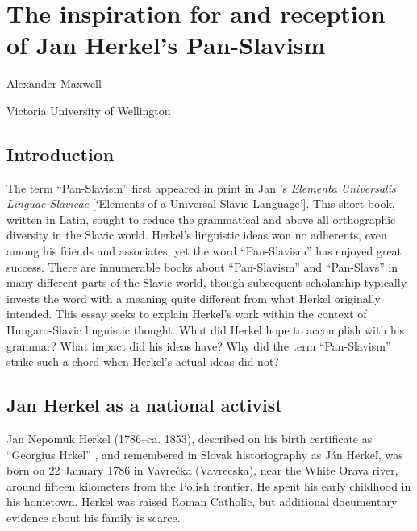 \chapter{The inspiration for and reception of Jan Herkel’s Pan-Slavism}
\label{ch:Maxwell}

{\Large Alexander Maxwell}\smallskip

\noindent Victoria University of Wellington\bigskip

\section{Introduction}

\noindent The term “Pan-Slavism” first appeared in print in Jan \citeauthor{herkel_elementa_1826}’s \citeyear{herkel_elementa_1826} \textit{Elementa Universalis Linguae Slavicae} [‘Elements of a Universal Slavic Language’]. This short book, written in Latin, sought to reduce the grammatical and above all orthographic diversity in the Slavic world. Herkel’s linguistic ideas won no adherents, even among his friends and associates, yet the word “Pan-Slavism” has enjoyed great success. There are innumerable books about “Pan-Slavism” and “Pan-Slavs” in many different parts of the Slavic world, though subsequent scholarship typically invests the word with a meaning quite different from what Herkel originally intended. This essay seeks to explain Herkel’s work within the context of Hungaro-Slavic linguistic thought. What did Herkel hope to accomplish with his grammar? What impact did his ideas have? Why did the term “Pan-Slavism” strike such a chord when Herkel’s actual ideas did not?

\section{Jan Herkel as a national activist}

Jan Nepomuk Herkel (1786--ca. 1853), described on his birth certificate as “Geor\-gius Hrkel” \citep[404]{treimer_johannes_1931}, and remembered in Slovak historiography as Ján Herkeľ, was born on 22 January 1786 in Vavrečka (Vavrecska), near the White Orava river, around fifteen kilometers from the Polish frontier. He spent his early childhood in his hometown. Herkel was raised Roman Catholic, but additional documentary evidence about his family is scarce.

